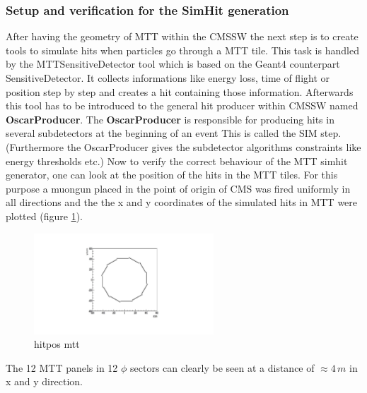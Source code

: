 		\subsubsection{Setup and verification for the SimHit generation}
			After having the geometry of MTT within the CMSSW the next step is to create tools to simulate hits when particles go through a MTT tile.
			This task is handled by the MTTSensitiveDetector tool which is based on the Geant4 counterpart SensitiveDetector.
			It collects informations like energy loss, time of flight or position step by step and creates a hit containing those information.
			Afterwards this tool has to be introduced to the general hit producer within CMSSW named \textbf{OscarProducer}.
			The \textbf{OscarProducer} is responsible for producing hits in several subdetectors at the beginning of an event
			This is called the SIM step.
			(Furthermore the OscarProducer gives the subdetector algorithms constraints like energy thresholds etc.)
			Now to verify the correct behaviour of the MTT simhit generator, one can look at the position of the hits in the MTT tiles.
			For this purpose a muongun placed in the point of origin of CMS was fired uniformly in all directions and the the x and y coordinates of the simulated hits in MTT were plotted (figure
			\ref{fig:hitpos_mtt}).
			\begin{figure}[htbp]
				\centering
				\includegraphics[width=0.6\textwidth]{Figures/erdogan/hitpos_mtt.png}
				\caption{hitpos mtt}
				\label{fig:hitpos_mtt}
			\end{figure}
			The 12 MTT panels in 12 $\phi$ sectors can clearly be seen at a distance of $\approx4\,m$ in x and y direction.
